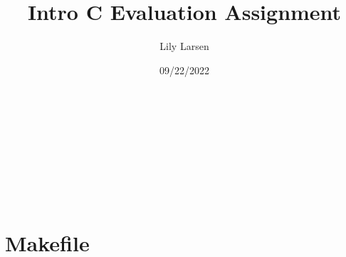 \documentclass{article}
\title{Intro C Evaluation Assignment}
\date{09/22/2022}
\author{Lily Larsen}
\newcommand{\nicecode}[2]{\inputminted[linenos=true,breaklines,fontsize=\small]{#1}{#2}}
\begin{document}
\maketitle
\newpage

\section{}
\nicecode{c}{1.c}
\newpage

\section{}
\nicecode{c}{2.c}
\newpage

\section{}
\nicecode{c}{3.c}
\newpage

\section{}
\nicecode{c}{4.c}
\newpage

\section{Makefile}
\nicecode{make}{makefile}
\end{document}
